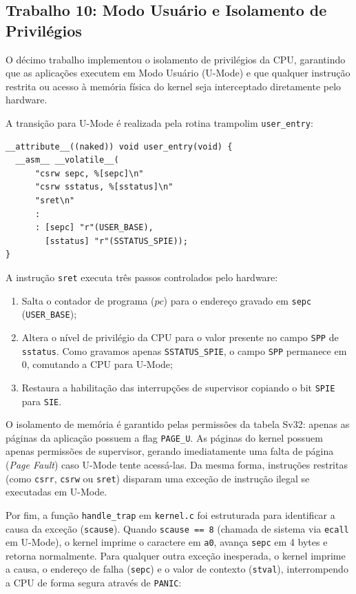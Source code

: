 \documentclass[12pt]{article}
\begin{document}
\subsection{Trabalho 10: Modo Usuário e Isolamento de Privilégios}

O décimo trabalho implementou o isolamento de privilégios da CPU, garantindo que as aplicações executem em Modo Usuário (U-Mode) e que qualquer instrução restrita ou acesso à memória física do kernel seja interceptado diretamente pelo hardware.

A transição para U-Mode é realizada pela rotina trampolim \texttt{user\_entry}:

\begin{verbatim}
__attribute__((naked)) void user_entry(void) {
  __asm__ __volatile__(
      "csrw sepc, %[sepc]\n"
      "csrw sstatus, %[sstatus]\n"
      "sret\n"
      :
      : [sepc] "r"(USER_BASE),
        [sstatus] "r"(SSTATUS_SPIE));
}
\end{verbatim}

A instrução \texttt{sret} executa três passos controlados pelo hardware:
\begin{enumerate}
    \item Salta o contador de programa ($pc$) para o endereço gravado em \texttt{sepc} (\texttt{USER\_BASE});
    \item Altera o nível de privilégio da CPU para o valor presente no campo \texttt{SPP} de \texttt{sstatus}. Como gravamos apenas \texttt{SSTATUS\_SPIE}, o campo \texttt{SPP} permanece em 0, comutando a CPU para U-Mode;
    \item Restaura a habilitação das interrupções de supervisor copiando o bit \texttt{SPIE} para \texttt{SIE}.
\end{enumerate}

O isolamento de memória é garantido pelas permissões da tabela Sv32: apenas as páginas da aplicação possuem a flag \texttt{PAGE\_U}. As páginas do kernel possuem apenas permissões de supervisor, gerando imediatamente uma falta de página (\textit{Page Fault}) caso U-Mode tente acessá-las. Da mesma forma, instruções restritas (como \texttt{csrr}, \texttt{csrw} ou \texttt{sret}) disparam uma exceção de instrução ilegal se executadas em U-Mode.

Por fim, a função \texttt{handle\_trap} em \texttt{kernel.c} foi estruturada para identificar a causa da exceção (\texttt{scause}). Quando \texttt{scause == 8} (chamada de sistema via \texttt{ecall} em U-Mode), o kernel imprime o caractere em \texttt{a0}, avança \texttt{sepc} em 4 bytes e retorna normalmente. Para qualquer outra exceção inesperada, o kernel imprime a causa, o endereço de falha (\texttt{sepc}) e o valor de contexto (\texttt{stval}), interrompendo a CPU de forma segura através de \texttt{PANIC}:
\end{document}
